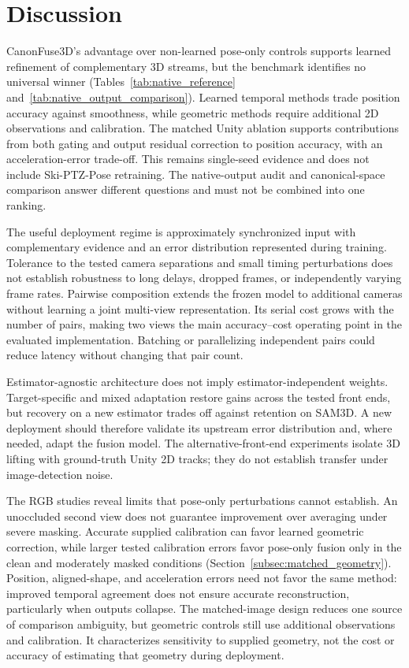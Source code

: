 \documentclass[preprint,12pt]{elsarticle}
\begin{document}
\FloatBarrier
\section{Discussion}
\label{sec:discussion}

CanonFuse3D's advantage over non-learned pose-only controls supports learned refinement of complementary 3D streams, but the benchmark identifies no universal winner (Tables~\ref{tab:native_reference} and~\ref{tab:native_output_comparison}). Learned temporal methods trade position accuracy against smoothness, while geometric methods require additional 2D observations and calibration. The matched Unity ablation supports contributions from both gating and output residual correction to position accuracy, with an acceleration-error trade-off. This remains single-seed evidence and does not include Ski-PTZ-Pose retraining. The native-output audit and canonical-space comparison answer different questions and must not be combined into one ranking.

The useful deployment regime is approximately synchronized input with complementary evidence and an error distribution represented during training. Tolerance to the tested camera separations and small timing perturbations does not establish robustness to long delays, dropped frames, or independently varying frame rates. Pairwise composition extends the frozen model to additional cameras without learning a joint multi-view representation. Its serial cost grows with the number of pairs, making two views the main accuracy--cost operating point in the evaluated implementation. Batching or parallelizing independent pairs could reduce latency without changing that pair count.

Estimator-agnostic architecture does not imply estimator-independent weights. Target-specific and mixed adaptation restore gains across the tested front ends, but recovery on a new estimator trades off against retention on SAM3D. A new deployment should therefore validate its upstream error distribution and, where needed, adapt the fusion model. The alternative-front-end experiments isolate 3D lifting with ground-truth Unity 2D tracks; they do not establish transfer under image-detection noise.

The RGB studies reveal limits that pose-only perturbations cannot establish. An unoccluded second view does not guarantee improvement over averaging under severe masking. Accurate supplied calibration can favor learned geometric correction, while larger tested calibration errors favor pose-only fusion only in the clean and moderately masked conditions (Section~\ref{subsec:matched_geometry}). Position, aligned-shape, and acceleration errors need not favor the same method: improved temporal agreement does not ensure accurate reconstruction, particularly when outputs collapse. The matched-image design reduces one source of comparison ambiguity, but geometric controls still use additional observations and calibration. It characterizes sensitivity to supplied geometry, not the cost or accuracy of estimating that geometry during deployment.
\end{document}
